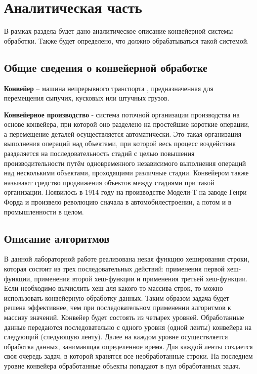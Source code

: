 \documentclass[a4paper,12pt]{report}
\begin{document}
    \newpage

    \chapter{Аналитическая часть}
    
        \label{sec:analitic_part}
        	В рамках раздела будет дано аналитическое описание конвейерной системы обработки. Также будет определено, что должно обрабатываться такой системой.
	
	\section{Общие сведения о конвейерной  обработке}

			\textbf{Конвейер} – машина непрерывного транспорта \cite{mednov}, предназначенная для перемещения сыпучих, кусковых или штучных грузов.

			\textbf{Конвейерное производство} - система поточной организации производства на основе конвейера, при которой оно разделено на простейшие короткие операции, а перемещение деталей осуществляется автоматически. 
			Это такая организация выполнения операций над объектами, при которой весь процесс воздействия разделяется на последовательность стадий с целью повышения производительности путём одновременного независимого выполнения операций над несколькими объектами, проходящими различные стадии. 
			Конвейером также называют средство продвижения объектов между стадиями при такой организации\cite{wiki}. 
			Появилось в 1914 году на производстве Модели-Т на заводе Генри Форда\cite{ford} и произвело революцию сначала в автомобилестроении, а потом и в промышленности в целом.
		
	\section{Описание алгоритмов}
        
			В данной лабораторной работе реализована некая функцию хеширования строки, которая состоит из трех последовательных действий: применения первой хеш-функции, применения второй хеш-функции и применения третьей хеш-функции. 
			Если необходимо вычислить хеш для какого-то массива строк, то можно использовать конвейерную обработку данных. 
			Таким образом задача будет решена эффективнее, чем при последовательном применении алгоритмов к массиву значений.  
			Конвейер будет состоять из четырех уровней. 
			Обработанные данные передаются последовательно с одного уровня (одной ленты) конвейера на следующий (следующую ленту). 
			Далее на каждом уровне осуществляется обработка данных, занимающая определенное время. 
			Для каждой ленты создается своя очередь задач, в которой хранятся все необработанные строки. 
			На последнем уровне конвейера обработанные объекты попадают в пул обработанных задач.
			
\end{document}
